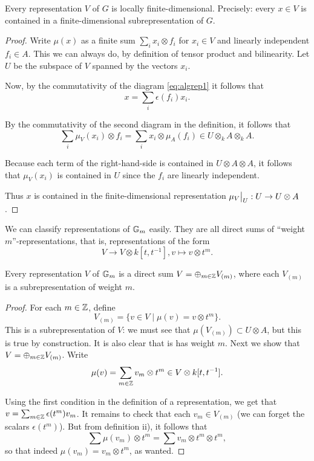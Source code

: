 \documentclass[11pt, english]{article}
\begin{document}
\begin{prop}
\label{propfinite}
Every representation $V$ of $G$ is locally finite-dimensional. Precisely: every $x \in V$ is contained in a finite-dimensional subrepresentation of $G$.
\end{prop}

\begin{proof}
Write $\mu(x)$ as a finite sum $\sum_i x_i \otimes f_i$ for $x_i \in V$ and linearly independent $f_i \in A$. This we can always do, by definition of tensor product and bilinearity. Let $U$ be the subspace of $V$ spanned by the vectors $x_i$. 

Now, by the commutativity of the diagram \eqref{eq:algrep1} it follows that $$ x = \sum_i \epsilon(f_i) x_i. $$

By the commutativity of the second diagram in the definition, it follows that
$$
\sum_i \mu_V (x_i) \otimes f_i = \sum_i x_i \otimes \mu_A(f_i) \in U \otimes_k A \otimes_k A.
$$

Because each term of the right-hand-side is contained in $U \otimes A \otimes A$, it follows that $\mu_V(x_i)$ is contained in $U$ since the $f_i$ are linearly independent.

Thus $x$ is contained in the finite-dimensional representation $\restr{\mu_V}{U}:U \to U \otimes A$.
\end{proof}

We can classify representations of $\mathbb{G}_m$ easily. They are all direct sums of ``weight $m$''-representations, that is, representations of the form $$V \to V \otimes k[t, t^{-1}], v \mapsto v \otimes t^m.$$ 

\begin{prop}
\label{propgm}
 Every representation $V$ of $\mathbb{G}_m$ is a direct sum $V = \oplus_{m \in \mathbb{Z}} V_{(m)}$, where each $V_{(m)}$ is a subrepresentation of weight $m$. 
\end{prop}

\begin{proof}
For each $m \in \mathbb{Z}$, define
\[
V_{(m)} = \{ v \in V \mid \mu(v) = v \otimes t^m \}.
\]
This is a subrepresentation of $V$: we must see that $\mu(V_{(m)}) \subset U \otimes A$, but this is true by construction. It is also clear that is has weight $m$. Next we show that $V = \oplus_{m \in \mathbb{Z}} V_{(m)}$. Write
\[
\mu(v) = \sum_{m \in \mathbb{Z}} v_m \otimes t^m \in V \otimes k[t,t^{-1}].
\]

Using the first condition in the definition of a representation, we get that $v = \sum_{m \in \mathbb{Z}} \epsilon(t^m)v_m$. It remains to check that each $v_m \in V_{(m)}$ (we can forget the scalars $\epsilon(t^m)$). But from definition ii), it follows that
\[
\sum \mu(v_m) \otimes t^m = \sum v_m \otimes t^m \otimes t^m,
\]
so that indeed $\mu(v_m)= v_m \otimes t^m$, as wanted.
\end{proof}
\end{document}
